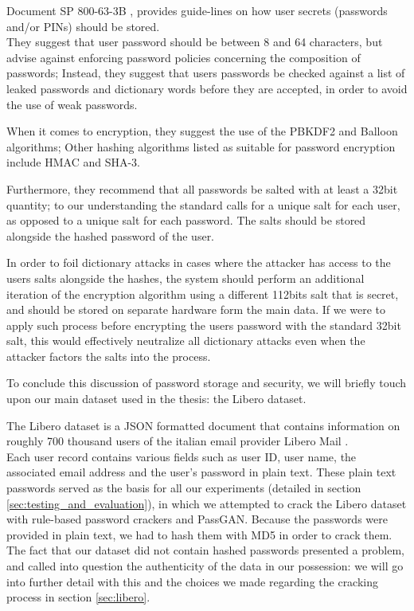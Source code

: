 Document SP 800-63-3B \cite{NIST_2017}, provides guide-lines on how user secrets (passwords and/or PINs) should be stored.\\
They suggest that user password should be between 8 and 64 characters, but advise against enforcing password policies concerning the composition of passwords; Instead, they suggest that users passwords be checked against a list of leaked passwords and dictionary words before they are accepted, in order to avoid the use of weak passwords.

When it comes to encryption, they suggest the use of the PBKDF2 and Balloon algorithms; Other hashing algorithms listed as suitable for password encryption include HMAC and SHA-3.

Furthermore, they recommend that all passwords be salted with at least a 32bit quantity; to our understanding the standard calls for a unique salt for each user, as opposed to a unique salt for each password. The salts should be stored alongside the hashed password of the user.

In order to foil dictionary attacks in cases where the attacker has access to the users salts alongside the hashes, the system should perform an additional iteration of the encryption algorithm using a different 112bits salt that is secret, and should be stored on separate hardware form the main data.\newline 
If we were to apply such process before encrypting the users password with the standard 32bit salt, this would effectively neutralize all dictionary attacks even when the attacker factors the salts into the process.

To conclude this discussion of password storage and security, we will briefly touch upon our main dataset used in the thesis: the Libero dataset.

The Libero dataset is a JSON formatted document that contains information on roughly 700 thousand users of the italian email provider Libero Mail \cite{libero_leak}.\\
Each user record contains various fields such as  user ID, user name, the associated email address and the user's password in plain text.
These plain text passwords served as the basis for all our experiments (detailed in section \ref{sec:testing_and_evaluation}), in which we attempted to crack the Libero dataset with rule-based password crackers and PassGAN. Because the passwords were provided in plain text, we had to hash them with MD5 in order to crack them.
The fact that our dataset did not contain hashed passwords presented a problem, and called into question the authenticity of the data in our possession: we will go into further detail with this  and the choices we made regarding the cracking process in section \ref{sec:libero}.  

